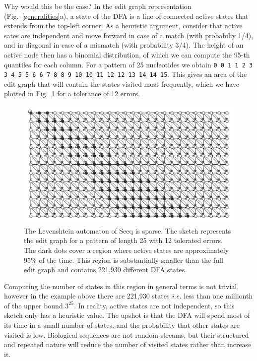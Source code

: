 \documentclass[12pt]{article}
\begin{document}
Why would this be the case? In the edit graph representation
(Fig.~\ref{generalities}a), a state of the DFA is a line of connected
active states that extends from the top-left corner. As a heuristic
argument, consider that active sates are independent and move forward
in case of a match (with probabiliy 1/4), and in diagonal in case of
a mismatch (with probability 3/4). The height
of an active node then has a binomial distribution, of which we can
compute the 95-th quantiles for each column. For a pattern of
25 nucleotides we obtain \texttt{0  0  1  1  2  3  3  4  5  5  6  6
7  8  8  9 10 10 11 12 12 13 14 14 15}. This gives an area of the
edit graph that will contain the states visited most frequently,
which we have plotted in Fig.~\ref{sparsity} for a tolerance of 
12 errors.

\begin{figure}[!tpb]
\centerline{\includegraphics[scale=0.65]{sparsity_of_the_DFA.pdf}}
\caption{The Levenshtein automaton of Seeq is sparse. The sketch
represents the edit graph for a pattern of length 25 with 12
tolerated errors. The dark dots cover a region where active
states are approximately 95\% of the time. This region is
substantially smaller than the full edit graph and contains
221,930 different DFA states.
}\label{sparsity}
\end{figure}

Computing the number of states in this region in general terms is
not trivial, however in the example above there are 221,930 states
\textit{i.e.} less than one millionth of the upper bound $3^{25}$.
In reality, active states are not independent, so this sketch
only has a heuristic value. The upshot is that the DFA will spend
most of its time in a small number of states, and the probability
that other states are visited is low. Biological sequences are
not random streams, but their structured and repeated nature will
reduce the number of visited states rather than increase it.
\end{document}
